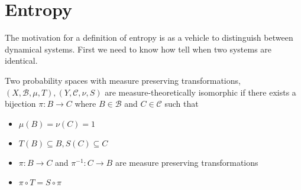 \documentclass[11pt]{article}
\newenvironment{defin}
	{\begin{mdframed}[backgroundcolor=white, roundcorner=5pt, linewidth=1pt]}
	{\end{mdframed}}
\newcommand{\mdf}[1]{{\color{red} #1}}
\begin{document}
\section{Entropy}
The motivation for a definition of entropy is as a vehicle to distinguish between dynamical systems. First we need to know how tell when two systems are identical.
\begin{defin}
	Two probability spaces with measure preserving transformations, $(X,\mathcal{B},\mu,T),(Y,\mathcal{C}, \nu, S)$ are \mdf{measure-theoretically isomorphic} if there exists a bijection $\pi:B\to C$ where $B\in\mathcal{B}$ and $C\in\mathcal{C}$ such that
	\begin{itemize}
		\item $\mu(B)=\nu(C)=1$
		\item $T(B)\subseteq B, S(C)\subseteq C$
		\item $\pi: B\to C$ and $\pi^{-1}:C\to B$ are measure preserving transformations
		\item $\pi\circ T = S\circ\pi$
		\begin{figure}[H]
			\centering
		\end{figure}	
	\end{itemize}
	

\end{defin}
\end{document}
